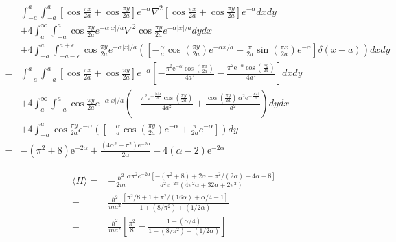 \begin{enumerate}
\begin{align*}
    &\int_{-a}^a\int_{-a}^a 
    [\cos\frac{\pi x}{2a}+
    \cos\frac{\pi y}{2a}]e^{-\alpha}
    \nabla^2[\cos\frac{\pi x}{2a}+
    \cos\frac{\pi y}{2a}]e^{-\alpha}dxdy\\
    &+4
    \int_{a}^\infty\int_{-a}^a 
    \cos\frac{\pi y}{2a}
    e^{-\alpha|x|/a}
    \nabla^2 \cos\frac{\pi y}{2a}
    e^{-\alpha|x|/a} dydx\\
    &+4
    \int_{-a}^a
    \int_{-a-\epsilon}^{a+\epsilon}
    \cos\frac{\pi y}{2a}e^{-\alpha|x|/a}
    \left(
    \left[
    -\frac{\alpha}{a}
    \cos\left(\frac{\pi y}{2a}\right)
    e^{-\alpha x/a}
    +\frac{\pi}{2a}
    \sin\left(\frac{\pi x}{2a}\right)e^{-\alpha}
    \right]\delta(x-a)
    \right)dxdy
    \\
    =&
   \int_{-a}^a\int_{-a}^a 
    [\cos\frac{\pi x}{2a}+
    \cos\frac{\pi y}{2a}]e^{-\alpha}
    \left[
    -\frac{\pi^{2} \mathrm{e}^{-{\alpha}} \cos\left(\frac{\pi x}{2a}\right)}{4a^{2}}
    -\frac{\pi^{2} \mathrm{e}^{-{\alpha}} \cos\left(\frac{\pi y}{2a}\right)}{4a^{2}}
    \right]dxdy\\
    &+4
    \int_{a}^\infty\int_{-a}^a 
    \cos\frac{\pi y}{2a}
    e^{-\alpha|x|/a}
    \left(
    -\frac{\pi^{2} \mathrm{e}^{-\frac{\left|x\right| {\alpha}}{a}} \cos\left(\frac{\pi y}{2a}\right)}{4a^{2}}
    +
    \frac{\cos\left(\frac{\pi y}{2a}\right) \, {\alpha}^{2} \mathrm{e}^{-\frac{{\alpha} \left|x\right|}{a}}}{a^{2}}
    \right)
     dydx\\
    &+4
    \int_{-a}^a
    \cos\frac{\pi y}{2a}e^{-\alpha}
    \left(
    \left[
    -\frac{\alpha}{a}
    \cos\left(\frac{\pi y}{2a}\right)
    e^{-\alpha }
    +\frac{\pi}{2a}
    e^{-\alpha}
    \right]
    \right)dy\\
=&-\left(\pi^{2} + 8\right) \mathrm{e}^{-2{\alpha}}+
\frac{\left(4{\alpha}^{2} - \pi^{2}\right) \mathrm{e}^{-2{\alpha}}}{2{\alpha}}-4\left({\alpha} - 2\right) \mathrm{e}^{-2{\alpha}}
\end{align*}

\begin{align*}
    \langle H\rangle=&
    -\frac{\hbar^2}{2m}
    \frac{\alpha\pi^2
    e^{-2\alpha}
    [
    -(\pi^2+8)+
    2\alpha - \pi^2/(2\alpha)
    -4\alpha+8]
    }
    {a^2e^{-2\alpha}(4\pi^2\alpha + 32\alpha + 2\pi^2)}\\
    =&
   \frac{\hbar^2}{ma^2}
    \frac{
    [
    \pi^2/8+1 + \pi^2/(16\alpha)
    + \alpha/4-1]
    }
    {1 + (8/\pi^2) + (1/2\alpha)}\\
    =&
    \frac{\hbar^2}{ma^2}
    \left[
    \frac{\pi^2}{8}
    -
    \frac{
    1-(\alpha/4)
    }
    {1 + (8/\pi^2) + (1/2\alpha)}
    \right]
\end{align*}

\end{enumerate}


